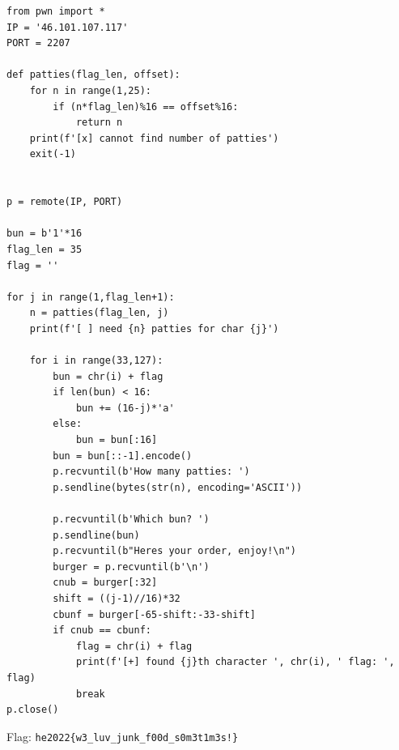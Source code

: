 {\small
\begin{verbatim}
from pwn import *
IP = '46.101.107.117'
PORT = 2207

def patties(flag_len, offset):
    for n in range(1,25):
        if (n*flag_len)%16 == offset%16:
            return n
    print(f'[x] cannot find number of patties')
    exit(-1)


p = remote(IP, PORT)

bun = b'1'*16
flag_len = 35
flag = ''

for j in range(1,flag_len+1):
    n = patties(flag_len, j)
    print(f'[ ] need {n} patties for char {j}')

    for i in range(33,127):
        bun = chr(i) + flag
        if len(bun) < 16:
            bun += (16-j)*'a'
        else:
            bun = bun[:16]
        bun = bun[::-1].encode()
        p.recvuntil(b'How many patties: ')
        p.sendline(bytes(str(n), encoding='ASCII'))

        p.recvuntil(b'Which bun? ')
        p.sendline(bun)
        p.recvuntil(b"Heres your order, enjoy!\n")
        burger = p.recvuntil(b'\n')
        cnub = burger[:32]
        shift = ((j-1)//16)*32
        cbunf = burger[-65-shift:-33-shift]
        if cnub == cbunf:
            flag = chr(i) + flag
            print(f'[+] found {j}th character ', chr(i), ' flag: ', flag)
            break
p.close()
\end{verbatim}
}
Flag: \verb+he2022{w3_luv_junk_f00d_s0m3t1m3s!}+





	









